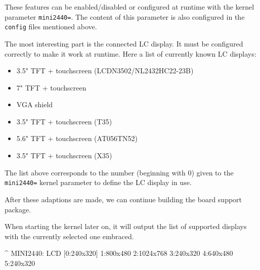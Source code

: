 These features can be enabled/disabled or configured at runtime with the kernel
parameter \texttt{mini2440=}. The content of this parameter is also configured
in the \texttt{config} files mentioned above.

The most interesting part is the connected LC display. It must be configured
correctly to make it work at runtime. Here a list of currently known LC displays:

\begin{itemize}
 \item 3.5" TFT + touchscreen (LCDN3502/NL2432HC22-23B)
 \item 7" TFT + touchscreen
 \item VGA shield
 \item 3.5" TFT + touchscreen (T35)
 \item 5.6" TFT + touchscreen (AT056TN52)
 \item 3.5" TFT + touchscreen (X35)
\end{itemize}

The list above corresponds to the number (beginning with 0) given to the
\texttt{mini2440=} kernel parameter to define the LC display in use.

After these adaptions are made, we can continue building the board support package.

When starting the kernel later on, it will output the list of supported displays
with the currently selected one embraced.

\begin{ptxshell}[escapechar=|]{^}
MINI2440: LCD [0:240x320] 1:800x480 2:1024x768 3:240x320 4:640x480 5:240x320
\end{ptxshell}
